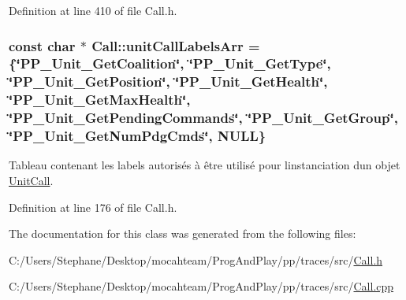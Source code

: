 Definition at line 410 of file Call.\+h.

\subsubsection[{\texorpdfstring{unit\+Call\+Labels\+Arr}{unitCallLabelsArr}}]{\setlength{\rightskip}{0pt plus 5cm}const char $\ast$ Call\+::unit\+Call\+Labels\+Arr = \{\char`\"{}P\+P\+\_\+\+Unit\+\_\+\+Get\+Coalition\char`\"{}, \char`\"{}P\+P\+\_\+\+Unit\+\_\+\+Get\+Type\char`\"{}, \char`\"{}P\+P\+\_\+\+Unit\+\_\+\+Get\+Position\char`\"{}, \char`\"{}P\+P\+\_\+\+Unit\+\_\+\+Get\+Health\char`\"{}, \char`\"{}P\+P\+\_\+\+Unit\+\_\+\+Get\+Max\+Health\char`\"{}, \char`\"{}P\+P\+\_\+\+Unit\+\_\+\+Get\+Pending\+Commands\char`\"{}, \char`\"{}P\+P\+\_\+\+Unit\+\_\+\+Get\+Group\char`\"{}, \char`\"{}P\+P\+\_\+\+Unit\+\_\+\+Get\+Num\+Pdg\+Cmds\char`\"{}, N\+U\+LL\}\hspace{0.3cm}{\ttfamily [static]}}\hypertarget{class_call_a7f62a26228ad25563c7dfbacda6f9759}{}\label{class_call_a7f62a26228ad25563c7dfbacda6f9759}
Tableau contenant les labels autorisés à être utilisé pour l\textquotesingle{}instanciation d\textquotesingle{}un objet \hyperlink{class_unit_call}{Unit\+Call}. 

Definition at line 176 of file Call.\+h.



The documentation for this class was generated from the following files\+:\begin{DoxyCompactItemize}
\item 
C\+:/\+Users/\+Stephane/\+Desktop/mocahteam/\+Prog\+And\+Play/pp/traces/src/\hyperlink{_call_8h}{Call.\+h}\item 
C\+:/\+Users/\+Stephane/\+Desktop/mocahteam/\+Prog\+And\+Play/pp/traces/src/\hyperlink{_call_8cpp}{Call.\+cpp}\end{DoxyCompactItemize}
